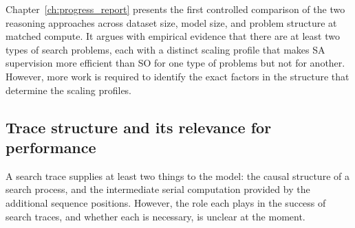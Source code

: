 Chapter~\ref{ch:progress_report} presents the first controlled comparison of the two reasoning approaches across dataset size, model size, and problem structure at matched compute.
It argues with empirical evidence that there are at least two types of search problems, each with a distinct scaling profile that makes SA supervision more efficient than SO for one type of problems but not for another.
However, more work is required to identify the exact factors in the structure that determine the scaling profiles.

\subsection{Trace structure and its relevance for performance}
\label{sec:bg_gap_trace}

A search trace supplies at least two things to the model: the causal structure of a search process, and the intermediate serial computation provided by the additional sequence positions.
However, the role each plays in the success of search traces, and whether each is necessary, is unclear at the moment.


